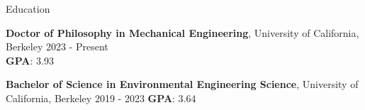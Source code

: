 \documentclass{resume} %
\begin{document}





\begin{rSection}{Education}

{\bf Doctor of Philosophy in Mechanical Engineering}, University of California, Berkeley \hfill {2023 - Present} \\
{\bf GPA}: 3.93  
\smallskip 



{\bf Bachelor of Science in Environmental Engineering Science}, University of California, Berkeley \hfill {2019 - 2023} \vspace{0 cm} 
{\bf GPA}: 3.64 






\end{rSection}
\end{document}
